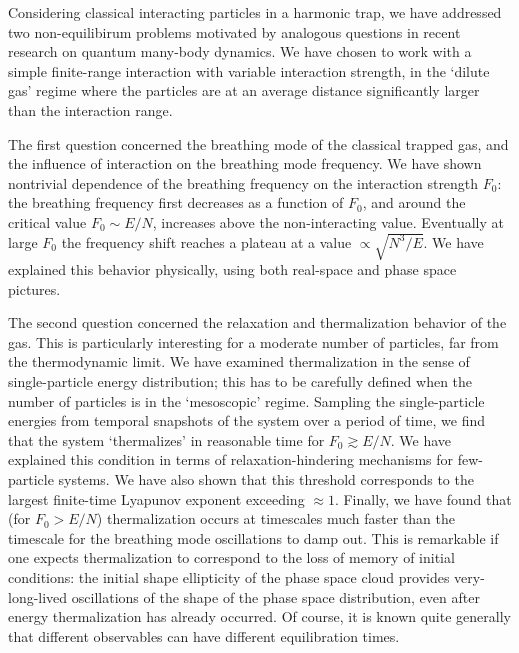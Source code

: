 \documentclass[a4paper, onecolumn]{revtex4-1}
\begin{document}
Considering classical interacting particles in a harmonic trap, we have addressed two
non-equilibirum problems motivated by analogous questions in recent research on quantum many-body
dynamics.  We have chosen to work with a simple finite-range interaction with variable interaction
strength, in the `dilute gas' regime where the particles are at an average distance significantly
larger than the interaction range.

The first question concerned the breathing mode of the classical trapped gas, and the influence of
interaction on the breathing mode frequency.  We have shown nontrivial dependence of the breathing
frequency on the interaction strength $F_0$: the breathing frequency first decreases as a function
of $F_0$, and around the critical value $F_0 \sim E/N$, increases above the non-interacting value.
Eventually at large $F_0$ the frequency shift reaches a plateau at a value $\propto\sqrt{N^3/E}$.
We have explained this behavior physically, using both real-space and phase space pictures.

The second question concerned the relaxation and thermalization behavior of the gas.  This is
particularly interesting for a moderate number of particles, far from the thermodynamic limit.  We
have examined thermalization in the sense of single-particle energy distribution; this has to be
carefully defined when the number of particles is in the `mesoscopic' regime.  Sampling the
single-particle energies from temporal snapshots of the system over a period of time, we find that
the system `thermalizes' in reasonable time for $F_0 \gtrsim E/N$.  We have explained this condition
in terms of relaxation-hindering mechanisms for few-particle systems.  We have also shown that this
threshold corresponds to the largest finite-time Lyapunov exponent exceeding $\approx1$.  Finally,
we have found that (for $F_0 > E/N$) thermalization occurs at timescales much faster than the
timescale for the breathing mode oscillations to damp out.  This is remarkable if one expects
thermalization to correspond to the loss of memory of initial conditions: the initial shape
ellipticity of the phase space cloud provides very-long-lived oscillations of the shape of the phase
space distribution, even after energy thermalization has already occurred.  
%
Of course, it is known quite generally that different observables can have different equilibration
times.
\end{document}
